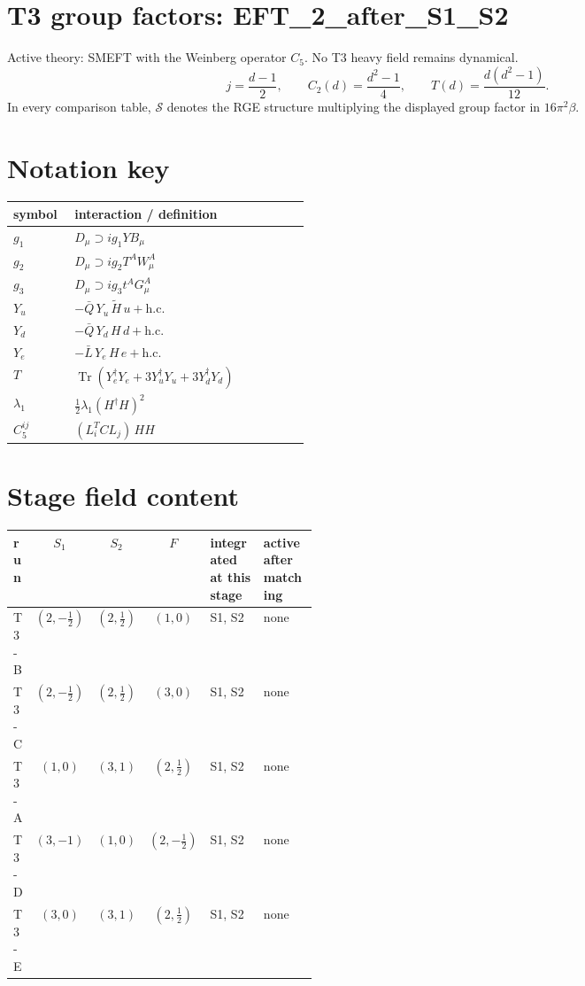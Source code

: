 \documentclass[9pt]{article}
\begin{document}
\section*{T3 group factors: EFT\_2\_after\_S1\_S2}
Active theory: SMEFT with the Weinberg operator $C_5$.  No T3 heavy field remains dynamical.
\[j=\frac{d-1}{2},\qquad C_2(d)=\frac{d^2-1}{4},\qquad T(d)=\frac{d(d^2-1)}{12}.\]
In every comparison table, $\mathcal{S}$ denotes the RGE structure multiplying the displayed group factor in $16\pi^2\beta$.
\section*{Notation key}
\begin{longtable}{@{}p{0.19\linewidth}p{0.73\linewidth}@{}}
\toprule
symbol & interaction / definition \\
\midrule
$g_1$ & $D_\mu\supset i g_1 Y B_\mu$ \\
$g_2$ & $D_\mu\supset i g_2 T^A W_\mu^A$ \\
$g_3$ & $D_\mu\supset i g_3 t^A G_\mu^A$ \\
$Y_u$ & $-\bar Q\,Y_u\,\widetilde H\,u+\mathrm{h.c.}$ \\
$Y_d$ & $-\bar Q\,Y_d\,H\,d+\mathrm{h.c.}$ \\
$Y_e$ & $-\bar L\,Y_e\,H\,e+\mathrm{h.c.}$ \\
$T$ & $\operatorname{Tr}\!\left(Y_e^\dagger Y_e+3Y_u^\dagger Y_u+3Y_d^\dagger Y_d\right)$ \\
$\lambda_1$ & $\frac12\lambda_1(H^\dagger H)^2$ \\
$C_5^{ij}$ & $(L_i^T C L_j)\,H H$ \\
\bottomrule
\end{longtable}
\section*{Stage field content}
\begin{longtable}{@{}lccc p{0.20\linewidth}p{0.20\linewidth}@{}}
\toprule
run & $S_1$ & $S_2$ & $F$ & integrated at this stage & active after matching \\
\midrule
T3-B & $(2,- \frac{1}{2})$ & $(2,\frac{1}{2})$ & $(1,0)$ & S1, S2 & none \\
T3-C & $(2,- \frac{1}{2})$ & $(2,\frac{1}{2})$ & $(3,0)$ & S1, S2 & none \\
T3-A & $(1,0)$ & $(3,1)$ & $(2,\frac{1}{2})$ & S1, S2 & none \\
T3-D & $(3,-1)$ & $(1,0)$ & $(2,- \frac{1}{2})$ & S1, S2 & none \\
T3-E & $(3,0)$ & $(3,1)$ & $(2,\frac{1}{2})$ & S1, S2 & none \\
\bottomrule
\end{longtable}
\end{document}
